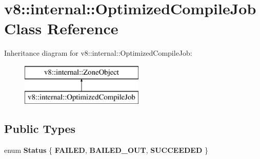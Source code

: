 \hypertarget{classv8_1_1internal_1_1_optimized_compile_job}{}\section{v8\+:\+:internal\+:\+:Optimized\+Compile\+Job Class Reference}
\label{classv8_1_1internal_1_1_optimized_compile_job}
Inheritance diagram for v8\+:\+:internal\+:\+:Optimized\+Compile\+Job\+:\begin{figure}[H]
\begin{center}
\leavevmode
\includegraphics[height=2.000000cm]{classv8_1_1internal_1_1_optimized_compile_job}
\end{center}
\end{figure}
\subsection*{Public Types}
\begin{DoxyCompactItemize}
\item 
\hypertarget{classv8_1_1internal_1_1_optimized_compile_job_aaade4762d7f84ab3eb77b12d13d534e6}{}enum {\bfseries Status} \{ {\bfseries F\+A\+I\+L\+E\+D}, 
{\bfseries B\+A\+I\+L\+E\+D\+\_\+\+O\+U\+T}, 
{\bfseries S\+U\+C\+C\+E\+E\+D\+E\+D}
 \}\label{classv8_1_1internal_1_1_optimized_compile_job_aaade4762d7f84ab3eb77b12d13d534e6}

\end{DoxyCompactItemize}
